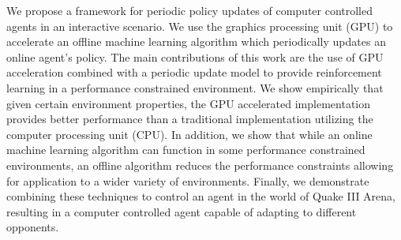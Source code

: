 \begin{umiabstract}
    We propose a framework for periodic policy updates of computer controlled agents in an interactive scenario. We use the graphics processing unit (GPU) to accelerate an offline machine learning algorithm which periodically updates an online agent's policy. The main contributions of this work are the use of GPU acceleration combined with a periodic update model to provide reinforcement learning in a performance constrained environment. We show empirically that given certain environment properties, the GPU accelerated implementation provides better performance than a traditional implementation utilizing the computer processing unit (CPU). In addition, we show that while an online machine learning algorithm can function in some performance constrained environments, an offline algorithm reduces the performance constraints allowing for application to a wider variety of environments. Finally, we demonstrate combining these techniques to control an agent in the world of Quake III Arena, resulting in a computer controlled agent capable of adapting to different opponents.
\end{umiabstract}

\clearpage{}